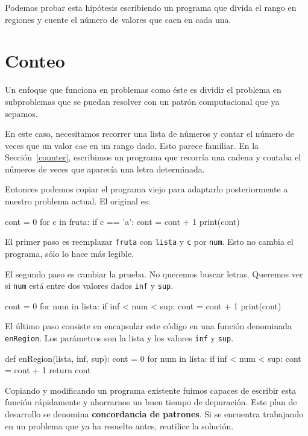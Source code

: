 Podemos probar esta hipótesis escribiendo un programa que divida el
rango en regiones y cuente el número de valores que caen en cada una.

\section{Conteo}


Un enfoque que funciona en problemas como éste es dividir el problema
en subproblemas que se puedan resolver con un patrón computacional
que ya sepamos.

En este caso, necesitamos recorrer una lista de números y contar el
número de veces que un valor cae en un rango dado. Esto parece familiar.
En la Sección~\ref{counter}, escribimos un programa que recorría
una cadena y contaba el números de veces que aparecía una letra determinada.

Entonces podemos copiar el programa viejo para adaptarlo posteriormente
a nuestro problema actual. El original es:
\begin{pythoncode}
cont = 0
for c in fruta:
  if c == 'a':
    cont = cont + 1
print(cont)
\end{pythoncode}

El primer paso es reemplazar \texttt{fruta} con \texttt{lista} y \texttt{c}
por \texttt{num}. Esto no cambia el programa, sólo lo hace más legible.

El segundo paso es cambiar la prueba. No queremos buscar letras. Queremos
ver si \texttt{num} está entre dos valores dados \texttt{inf} y \texttt{sup}.

\begin{pythoncode}
cont = 0
for num in lista:
  if inf < num < sup:
    cont = cont + 1
print(cont)
\end{pythoncode}

El último paso consiste en encapsular este código en una función denominada
\texttt{enRegion}. Los parámetros son la lista y los valores \texttt{inf}
y \texttt{sup}.
\begin{pythoncode}
def enRegion(lista, inf, sup):
  cont = 0
  for num in lista:
    if inf < num < sup:
      cont = cont + 1
  return cont
\end{pythoncode}

Copiando y modificando un programa existente fuimos capaces de escribir
esta función rápidamente y ahorrarnos un buen tiempo de depuración.
Este plan de desarrollo se denomina \textbf{concordancia de patrones}.
Si se encuentra trabajando en un problema que ya ha resuelto antes,
reutilice la solución.

